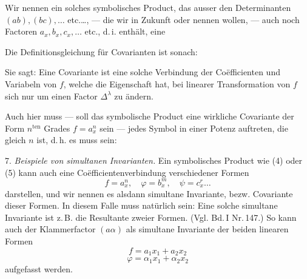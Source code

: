 Wir nennen ein solches symbolisches Product, das ausser den
Determinanten $(ab), (bc), \ldots$ etc.\ldots, — die wir in
Zukunft  oder  nennen
wollen, — auch noch Factoren $a_x, b_x, c_x, \ldots$ etc., d.\,i.
 enthält, eine 

Die Definitionsgleichung für Covarianten ist sonach:


Sie sagt: \glqq Eine Covariante ist eine solche Verbindung der
Co\"efficienten und Variabeln von $f$, welche die Eigenschaft hat,
bei linearer Transformation von $f$ sich nur um einen Factor
$\Delta^\lambda$ zu ändern.\grqq{}

Auch hier muss — soll das symbolische Product eine wirkliche
Covariante der Form $n^{\text{ten}}$ Grades $f=a_x^n$ sein —
jedes Symbol in einer Potenz auftreten, die gleich $n$ ist,
d.\,h. es muss sein:

7. \textit{Beispiele von simultanen Invarianten.} Ein symbolisches
Product wie (4) oder (5) kann auch eine Co\"efficientenverbindung
verschiedener Formen
\[
f = a_x^n, \quad \varphi = b_x^m, \quad \psi = c_x^r\ldots
\]
darstellen, und wir nennen es alsdann \glqq simultane Invariante,
bezw. Covariante\grqq{} dieser Formen. In diesem Falle muss
natürlich sein:
Eine solche simultane Invariante ist z.\,B. die Resultante zweier
Formen. (Vgl. Bd.\,I Nr.\,147.) So kann auch der Klammerfactor
$(a\alpha)$ als simultane Invariante der beiden linearen Formen
\[
f = a_1x_1 + a_2x_2
\]
\[
\varphi = \alpha_1x_1 + \alpha_2x_2
\]
aufgefasst werden.

